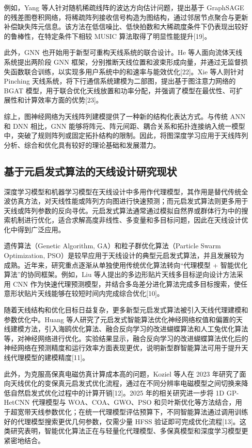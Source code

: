 \documentclass[UTF8,a4paper,12pt]{ctexart}
\begin{document}
例如，Yang 等人针对随机稀疏线阵的波达方向估计问题，提出基于 GraphSAGE 的残差图卷积网络，将稀疏阵列接收信号构造为图结构，通过邻居节点聚合与更新补偿缺失阵元信息。该方法在低信噪比、低快拍数和大稀疏度条件下仍表现出较好的鲁棒性，在特定条件下相较 MUSIC 算法取得了明显性能提升[19]。

此外，GNN 也开始用于新型可重构天线系统的联合设计。He 等人面向流体天线系统提出两阶段 GNN 框架，分别推断天线位置和波束形成向量，并通过无监督损失函数联合训练，以实现多用户系统中的和速率与能效优化[22]。Xie 等人则针对 Pinching 天线系统，将下行通信系统建模为二部图，提出基于图注意力网络的 BGAT 模型，用于联合优化天线放置和功率分配，并强调了模型在最优性、可扩展性和计算效率方面的优势[23]。

综上，图神经网络为天线阵列建模提供了一种新的结构化表达方式。与传统 ANN 和 DNN 相比，GNN 能够将阵元、阵元间距、耦合关系和拓扑连接纳入统一模型中，突破了规则阵列或固定拓扑结构的限制。因此，将图深度学习应用于天线阵列分析、综合和优化具有较好的理论基础和发展潜力。

\subsection{基于元启发式算法的天线设计研究现状}

深度学习模型和机器学习模型在天线设计中多用作代理模型，其作用是替代传统全波仿真方法，对天线性能或阵列方向图进行快速预测；而元启发式算法则更多用于天线或阵列参数的反向寻优。元启发式算法通常通过模拟自然界或群体行为中的搜索机制进行优化，适合求解高度非线性、多变量和多目标问题，因此在天线设计优化中得到广泛应用。

遗传算法（Genetic Algorithm, GA）和粒子群优化算法（Particle Swarm Optimization, PSO）是较早应用于天线设计的典型元启发式算法，并且发展较为成熟。近年来，研究重点逐渐从单独使用传统优化算法转向“代理模型 + 智能优化算法”的协同框架。例如，Liu 等人提出的多边形贴片天线多目标逆向设计方法采用 CNN 作为快速代理预测模型，并结合多岛差分进化算法完成多目标搜索，使任意形状贴片天线能够在较短时间内完成综合优化[10]。

随着天线结构和优化目标日益复杂，更多新型元启发式算法被引入天线代理建模和参数优化中。Huang 等人研究了元启发式智能算法优化神经网络权值和偏置的天线建模方法，引入海鸥优化算法、融合反向学习的改进蝴蝶算法和人工兔优化算法等，对神经网络进行优化。实验结果显示，融合反向学习的改进蝴蝶算法优化后的神经网络在预测精度和运行效率方面表现更优，说明新型群智能算法可用于提升天线代理模型的建模精度[11]。

此外，为克服高保真电磁仿真计算成本高的问题，Koziel 等人在 2023 年研究了面向天线优化的变保真元启发式优化流程，通过在不同分辨率电磁模型之间切换来降低自然启发式优化过程中的计算开销[12]。2025 年的相关研究进一步将 1D GP-HetCNN 代理模型与 WOA、COA、GWO、PSO 和贝叶斯优化等方法结合，用于超宽带天线参数优化；在统一代理模型评估预算下，不同智能算法通过调用训练好的代理模型搜索更优几何参数，仅需少量 HFSS 验证即可完成优化流程[13]。这类研究表明，智能优化算法正在与轻量化代理模型、多保真模型和深度学习模型更紧密地结合。
\end{document}
